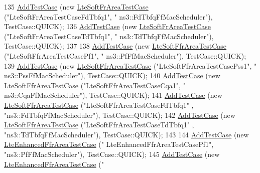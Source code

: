 \begin{DoxyCode}
135   \hyperlink{classns3_1_1TestCase_a3718088e3eefd5d6454569d2e0ddd835}{AddTestCase} (\textcolor{keyword}{new} \hyperlink{classLteSoftFrAreaTestCase}{LteSoftFrAreaTestCase} (\textcolor{stringliteral}{"LteSoftFrAreaTestCaseFdTbfq1"}, \textcolor{stringliteral}{"
      ns3::FdTbfqFfMacScheduler"}), TestCase::QUICK);
136   \hyperlink{classns3_1_1TestCase_a3718088e3eefd5d6454569d2e0ddd835}{AddTestCase} (\textcolor{keyword}{new} \hyperlink{classLteSoftFrAreaTestCase}{LteSoftFrAreaTestCase} (\textcolor{stringliteral}{"LteSoftFrAreaTestCaseTdTbfq1"}, \textcolor{stringliteral}{"
      ns3::TdTbfqFfMacScheduler"}), TestCase::QUICK);
137 
138   \hyperlink{classns3_1_1TestCase_a3718088e3eefd5d6454569d2e0ddd835}{AddTestCase} (\textcolor{keyword}{new} \hyperlink{classLteSoftFfrAreaTestCase}{LteSoftFfrAreaTestCase} (\textcolor{stringliteral}{"LteSoftFfrAreaTestCasePf1"}, \textcolor{stringliteral}{"
      ns3::PfFfMacScheduler"}), TestCase::QUICK);
139   \hyperlink{classns3_1_1TestCase_a3718088e3eefd5d6454569d2e0ddd835}{AddTestCase} (\textcolor{keyword}{new} \hyperlink{classLteSoftFfrAreaTestCase}{LteSoftFfrAreaTestCase} (\textcolor{stringliteral}{"LteSoftFfrAreaTestCasePss1"}, \textcolor{stringliteral}{"
      ns3::PssFfMacScheduler"}), TestCase::QUICK);
140   \hyperlink{classns3_1_1TestCase_a3718088e3eefd5d6454569d2e0ddd835}{AddTestCase} (\textcolor{keyword}{new} \hyperlink{classLteSoftFfrAreaTestCase}{LteSoftFfrAreaTestCase} (\textcolor{stringliteral}{"LteSoftFfrAreaTestCaseCqa1"}, \textcolor{stringliteral}{"
      ns3::CqaFfMacScheduler"}), TestCase::QUICK);
141   \hyperlink{classns3_1_1TestCase_a3718088e3eefd5d6454569d2e0ddd835}{AddTestCase} (\textcolor{keyword}{new} \hyperlink{classLteSoftFfrAreaTestCase}{LteSoftFfrAreaTestCase} (\textcolor{stringliteral}{"LteSoftFfrAreaTestCaseFdTbfq1"}
      , \textcolor{stringliteral}{"ns3::FdTbfqFfMacScheduler"}), TestCase::QUICK);
142   \hyperlink{classns3_1_1TestCase_a3718088e3eefd5d6454569d2e0ddd835}{AddTestCase} (\textcolor{keyword}{new} \hyperlink{classLteSoftFfrAreaTestCase}{LteSoftFfrAreaTestCase} (\textcolor{stringliteral}{"LteSoftFfrAreaTestCaseTdTbfq1"}
      , \textcolor{stringliteral}{"ns3::TdTbfqFfMacScheduler"}), TestCase::QUICK);
143 
144   \hyperlink{classns3_1_1TestCase_a3718088e3eefd5d6454569d2e0ddd835}{AddTestCase} (\textcolor{keyword}{new} \hyperlink{classLteEnhancedFfrAreaTestCase}{LteEnhancedFfrAreaTestCase} (\textcolor{stringliteral}{"
      LteEnhancedFfrAreaTestCasePf1"}, \textcolor{stringliteral}{"ns3::PfFfMacScheduler"}), TestCase::QUICK);
145   \hyperlink{classns3_1_1TestCase_a3718088e3eefd5d6454569d2e0ddd835}{AddTestCase} (\textcolor{keyword}{new} \hyperlink{classLteEnhancedFfrAreaTestCase}{LteEnhancedFfrAreaTestCase} (\textcolor{stringliteral}{"
}
\end{DoxyCode}
